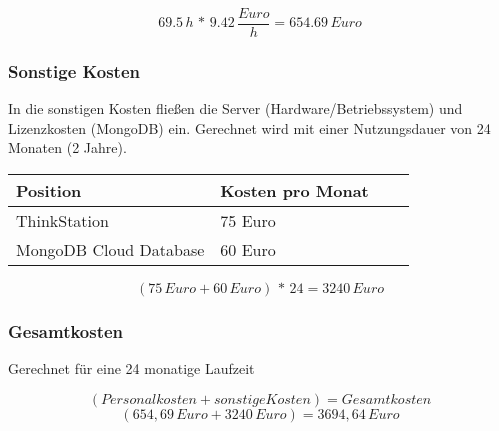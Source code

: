 	\[ 69.5\,h\,*\,9.42\,\frac{Euro}{h} = 654.69\,Euro \]


	\subsubsection{Sonstige Kosten}
	In die sonstigen Kosten fließen die Server (Hardware/Betriebssystem) und Lizenzkosten (MongoDB) ein. Gerechnet wird mit einer Nutzungsdauer von 24 Monaten (2 Jahre).\\

	\begin{table}[htp]

		\begin{center}
			\begin{tabular}{llll} \toprule
				Position & Kosten pro Monat \\ \bottomrule
				ThinkStation & 75 Euro \\
				MongoDB Cloud Database & 60 Euro \\ \bottomrule
			\end{tabular}
		\end{center}
	\end{table}
	
	\[ (75\,Euro + 60\,Euro)\,*\,24 = 3240\,Euro \]

	\subsubsection{Gesamtkosten}
	Gerechnet für eine 24 monatige Laufzeit
		
	\[ (Personalkosten + sonstige Kosten) = Gesamtkosten \]
	\[ (654,69\,Euro + 3240\,Euro) = 3694,64\,Euro \]


